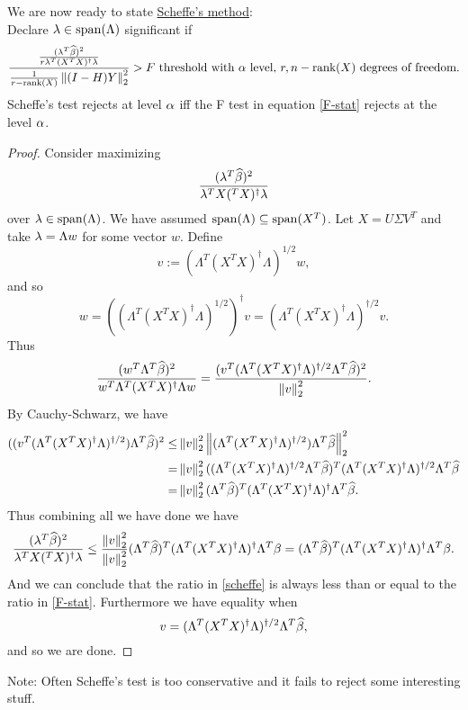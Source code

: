 We are now ready to state \underline{Scheffe's method}:\\

Declare $\lambda \in \operatorname{span}(\Lambda)$ significant if 
\begin{equation}\label{scheffe}
    \frac{
        \frac{(\lambda^T \widehat{\beta})^2}{r\lambda^T(X^TX)^{\dagger}\lambda}
    }{\frac{1}{r-\text{rank}(X)}\left\|(I-H)Y\right\|_2^2} > F \text{ threshold with ${\alpha}$ level, $r, n-\text{rank}(X)$ degrees of freedom.} 
\end{equation}
Scheffe's test rejects at level ${\alpha}$ iff the F test in equation \eqref{F-stat} rejects at the level ${\alpha}$.
\begin{proof}
    Consider maximizing 
    \[\frac{(\lambda^T \widehat{\beta})^2}{\lambda^T X(^TX)^\dagger \lambda} \]
    over $\lambda \in \operatorname{span}(\Lambda)$. We have assumed $\operatorname{span}(\Lambda) \subseteq \operatorname{span}(X^T)$. Let $X=U\Sigma V^T$ and take $\lambda = \Lambda w$ for some vector $w$. Define
    \[v:= (\Lambda^T(X^TX)^\dagger \Lambda)^{1/2}w, \]
    and so
    \[w= ((\Lambda^T(X^TX)^\dagger\Lambda)^{1/2})^\dagger v = (\Lambda^T(X^TX)^\dagger\Lambda)^{\dagger/2} v. \]
    Thus
    \[\frac{(w^T\Lambda^T \widehat{\beta})^2}{w^T\Lambda^T (X^TX)^\dagger \Lambda w} = \frac{(v^T(\Lambda^T(X^TX)^\dagger\Lambda)^{\dagger/2}\Lambda^T\widehat{\beta})^2}{\left\|v\right\|^2_2}. \]
    By Cauchy-Schwarz, we have 
    \begin{align*}
        ((v^T(\Lambda^T(X^TX)^\dagger\Lambda)^{\dagger/2})\Lambda^T\widehat{\beta})^2 
        \le& \left\|v\right\|_2^2 \left\|(\Lambda^T(X^TX)^\dagger\Lambda)^{\dagger/2})\Lambda^T\widehat{\beta}\right\|_2^2\\
         =&\left\|v\right\|_2^2 ((\Lambda^T(X^TX)^\dagger\Lambda)^{\dagger/2}\Lambda^T\widehat{\beta})^T(\Lambda^T(X^TX)^\dagger\Lambda)^{\dagger/2}\Lambda^T\widehat{\beta}\\
         =&\left\|v\right\|_2^2(\Lambda^T\widehat{\beta})^T(\Lambda^T(X^TX)^\dagger\Lambda)^{\dagger}\Lambda^T\widehat{\beta}.
    \end{align*}
    Thus combining all we have done we have
    \[\frac{(\lambda^T \widehat{\beta})^2}{\lambda^T X(^TX)^\dagger \lambda} \le \frac{\left\|v\right\|_2^2}{\left\|v\right\|_2^2}(\Lambda^T\widehat{\beta})^T(\Lambda^T(X^TX)^\dagger\Lambda)^{\dagger}\Lambda^T\beta=(\Lambda^T\widehat{\beta})^T(\Lambda^T(X^TX)^\dagger\Lambda)^{\dagger}\Lambda^T\beta. \]
    And we can conclude that the ratio in \eqref{scheffe} is always less than or equal to the ratio in \eqref{F-stat}. Furthermore we have equality when 
    \[v=(\Lambda^T(X^TX)^\dagger\Lambda)^{\dagger/2} \Lambda^T\widehat{\beta}, \]
    and so we are done.
\end{proof}
Note: Often Scheffe's test is too conservative and it fails to reject some interesting stuff.
